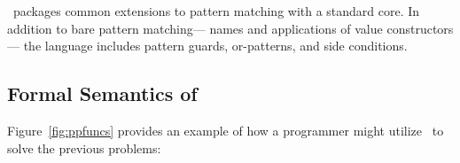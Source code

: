 \documentclass[article,screen,12pt, nonacm]{acmart}
\begin{document}
    \PPlus\ packages common extensions to pattern matching with a standard core.
    In addition to bare pattern matching— names and applications of value
    constructors— the language includes pattern guards, or-patterns, and side
    conditions. 
    
    

\subsection{Formal Semantics of \PPlus}














    
      

    
  Figure~\ref{fig:ppfuncs} provides an example of how a programmer might utilize
  \PPlus\ to solve the previous problems: 
\end{document}
